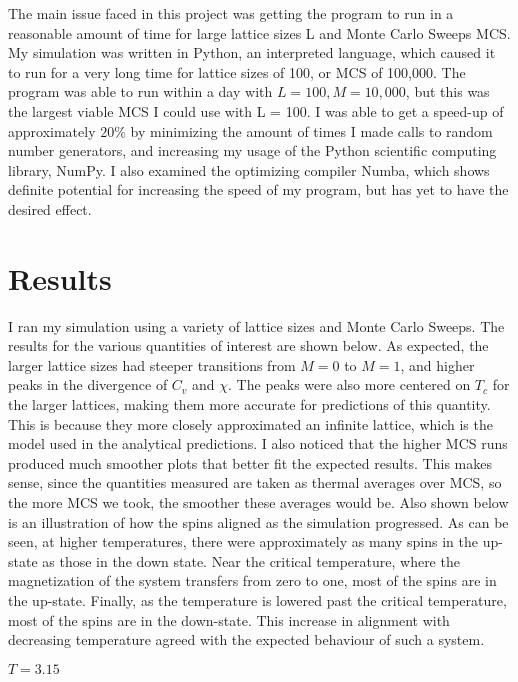 \documentclass[12pt]{article}
\begin{document}
The main issue faced in this project was getting the program to run in a reasonable amount of time for large lattice 
sizes L and Monte Carlo Sweeps MCS. My simulation was written in Python, an interpreted language, which caused it to run for 
a very long time for lattice sizes of 100, or MCS of 100,000. The program was able to run within a day with $L = 100, 
M = 10,000$, but this was the largest viable MCS I could use with L = 100. I was able to get a speed-up of approximately 
$20 \%$ by minimizing the amount of times I made calls to random number generators, and increasing my usage of the 
Python scientific computing library, NumPy. I also examined the optimizing compiler Numba, which shows definite potential 
for increasing the speed of my program, but has yet to have the desired effect.


\section{Results}

I ran my simulation using a variety of lattice sizes and Monte Carlo Sweeps. The results for the various quantities of 
interest are shown below. As expected, the larger lattice sizes had steeper transitions from $M = 0$ to $M = 1$, and 
higher peaks in the divergence of $C_v$ and $\chi$. The peaks were also more centered on $T_c$ for the larger lattices, 
making them more accurate for predictions of this quantity. This is because they more closely approximated an infinite lattice, 
which is the model used in the analytical predictions. I also noticed that the higher MCS runs produced much smoother 
plots that better fit the expected results. This makes sense, since the quantities measured are taken as thermal averages 
over MCS, so the more MCS we took, the smoother these averages would be. Also shown below is an illustration of how the spins 
aligned as the simulation progressed. As can be seen, at higher temperatures, there were approximately as many spins in the 
up-state as those in the down state. Near the critical temperature, where the magnetization of the system transfers from zero 
to one, most of the spins are in the up-state. Finally, as the temperature is lowered past the critical temperature, most of 
the spins are in the down-state. This increase in alignment with decreasing temperature agreed with the expected behaviour 
of such a system.


$T = 3.15$
\end{document}
